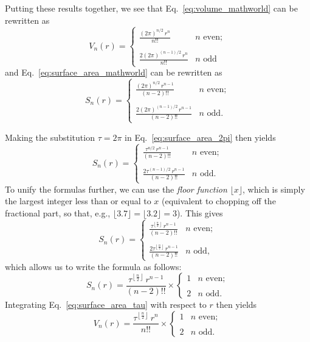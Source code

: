 {Putting these results together, we see that Eq.~\eqref{eq:volume_mathworld} can be rewritten as
\begin{equation}
\label{eq:volume_2pi}
V_n(r) = \begin{cases}
 \displaystyle \frac{(2\pi)^{n/2}\,r^n}{n!!} & n \text{ even}; \\ \\
 \displaystyle \frac{2(2\pi)^{(n-1)/2}\,r^n}{n!!} & n \text{ odd}
 \end{cases}
\end{equation}
and Eq.~\eqref{eq:surface_area_mathworld} can be rewritten as
\begin{equation}
\label{eq:surface_area_2pi}
S_n(r) = \begin{cases}
\displaystyle \frac{(2\pi)^{n/2}\,r^{n-1}}{(n-2)!!} & n \text{ even}; \\ \\
\displaystyle \frac{2(2\pi)^{(n-1)/2}\,r^{n-1}}{(n-2)!!} & n \text{ odd}.
\end{cases}
\end{equation}

Making the substitution $\tau=2\pi$ in Eq.~\eqref{eq:surface_area_2pi} then yields
\[
S_n(r) = \begin{cases}
\displaystyle \frac{\tau^{n/2}\,r^{n-1}}{(n-2)!!} & n \text{ even}; \\ \\
\displaystyle \frac{2\tau^{(n-1)/2}\,r^{n-1}}{(n-2)!!} & n \text{ odd}.
\end{cases} \]
To unify the formulas further, we can use the \emph{floor function} $\lfloor x \rfloor$, which is simply the largest integer less than or equal to $x$ (equivalent to chopping off the fractional part, so that, e.g., $\lfloor 3.7 \rfloor = \lfloor 3.2 \rfloor = 3$). This gives
\[ S_n(r) = \begin{cases}
 \displaystyle \frac{\tau^{\left\lfloor \frac{n}{2} \right\rfloor}\,r^{n-1}}{(n-2)!!} & n \text{ even}; \\ \\
 \displaystyle \frac{2\tau^{\left\lfloor \frac{n}{2} \right\rfloor}\,r^{n-1}}{(n-2)!!} & n \text{ odd},
 \end{cases} \]
which allows us to write the formula as follows:
\begin{equation}
\label{eq:surface_area_tau}
S_n(r) = \frac{\tau^{\left\lfloor \frac{n}{2} \right\rfloor}\,r^{n-1}}{(n-2)!!}\times \begin{cases}
1 & n \text{ even}; \\ \\
2 & n \text{ odd}.
\end{cases}
\end{equation}
Integrating Eq.~\eqref{eq:surface_area_tau} with respect to $r$ then yields
\begin{equation}
\label{eq:volume_tau}
V_n(r) = \frac{\tau^{\left\lfloor \frac{n}{2} \right\rfloor}\,r^n}{n!!}\times \begin{cases}
1 & n \text{ even}; \\ \\
2 & n \text{ odd}.
\end{cases}
\end{equation}

}

